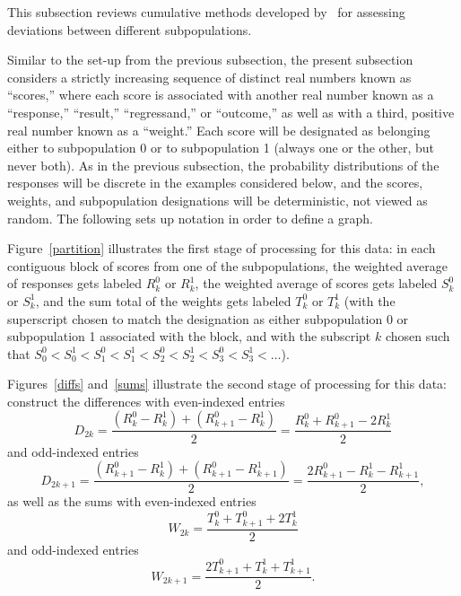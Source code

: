 \documentclass{article}
\begin{document}
This subsection reviews cumulative methods developed by~\cite{tygert_two}
for assessing deviations between different subpopulations.

Similar to the set-up from the previous subsection,
the present subsection considers a strictly increasing sequence
of distinct real numbers known as ``scores,'' where each score
is associated with another real number known as a ``response,'' ``result,''
``regressand,'' or ``outcome,'' as well as with a third, positive real number
known as a ``weight.''
Each score will be designated as belonging either to subpopulation 0
or to subpopulation 1 (always one or the other, but never both).
As in the previous subsection, the probability distributions
of the responses will be discrete in the examples considered below,
and the scores, weights, and subpopulation designations will be deterministic,
not viewed as random.
The following sets up notation in order to define a graph.

Figure~\ref{partition} illustrates the first stage of processing for this data:
in each contiguous block of scores from one of the subpopulations,
the weighted average of responses gets labeled $R^0_k$ or $R^1_k$,
the weighted average of scores gets labeled $S^0_k$ or $S^1_k$,
and the sum total of the weights gets labeled $T^0_k$ or $T^1_k$
(with the superscript chosen to match the designation as either subpopulation 0
or subpopulation 1 associated with the block, and with the subscript $k$
chosen such that
$S^0_0 < S^1_0 < S^0_1 < S^1_1 < S^0_2 < S^1_2 < S^0_3 < S^1_3 < \dots$).

Figures~\ref{diffs} and~\ref{sums} illustrate the second stage
of processing for this data: construct the differences
with even-indexed entries
%
\begin{equation}
\label{diff_even}
D_{2k} = \frac{(R^0_k - R^1_k) + (R^0_{k+1} - R^1_k)}{2}
       = \frac{R^0_k + R^0_{k+1} - 2R^1_k}{2}
\end{equation}
%
and odd-indexed entries
%
\begin{equation}
\label{diff_odd}
D_{2k+1} = \frac{(R^0_{k+1} - R^1_k) + (R^0_{k+1} - R^1_{k+1})}{2}
         = \frac{2R^0_{k+1} - R^1_k - R^1_{k+1}}{2},
\end{equation}
%
as well as the sums with even-indexed entries
%
\begin{equation}
\label{sum_even}
W_{2k} = \frac{T^0_k + T^0_{k+1} + 2T^1_k}{2}
\end{equation}
%
and odd-indexed entries
%
\begin{equation}
\label{sum_odd}
W_{2k+1} = \frac{2T^0_{k+1} + T^1_k + T^1_{k+1}}{2}.
\end{equation}
%
\end{document}
